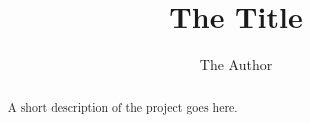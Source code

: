\documentclass[11pt
              , a4paper
              , twoside
              , openright
              ]{report}
\title{The Title}
\author{The Author}
\date{}
\begin{document}
\frontmatter



\begin{abstract}

A short description of the project goes here.

\end{abstract}



% 




\mainmatter



% 
% 
% 



\backmatter



%


\end{document}
